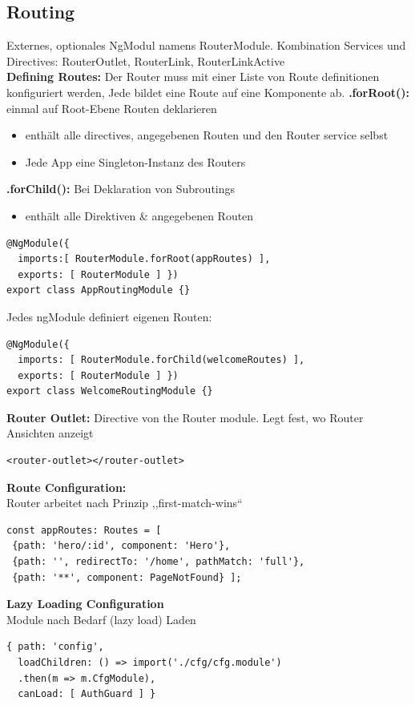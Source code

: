 \subsection{Routing}
Externes, optionales NgModul namens RouterModule. Kombination Services und Directives: RouterOutlet, RouterLink, RouterLinkActive\\
\textbf{Defining Routes:} Der Router muss mit einer Liste von Route definitionen konfiguriert werden, Jede bildet eine Route auf eine Komponente ab.
\textbf{.forRoot():} einmal auf Root-Ebene Routen deklarieren
\begin{itemize}
    \item enthält alle directives, angegebenen Routen und den Router service selbst
    \item Jede App eine Singleton-Instanz des Routers
\end{itemize}
\textbf{.forChild():} Bei Deklaration von Subroutings
\begin{itemize}
    \item enthält alle Direktiven \& angegebenen Routen
\end{itemize}
\begin{lstlisting}[style=JavaScript]
@NgModule({
  imports:[ RouterModule.forRoot(appRoutes) ],
  exports: [ RouterModule ] })
export class AppRoutingModule {}
\end{lstlisting}
Jedes ngModule definiert eigenen Routen:
\begin{lstlisting}[style=JavaScript]
@NgModule({
  imports: [ RouterModule.forChild(welcomeRoutes) ],
  exports: [ RouterModule ] })
export class WelcomeRoutingModule {}
\end{lstlisting}
\textbf{Router Outlet:} Directive von the Router module. Legt fest, wo Router Ansichten anzeigt
\begin{lstlisting}
<router-outlet></router-outlet>
\end{lstlisting}
\textbf{Route Configuration:}\\
Router arbeitet nach Prinzip ,,first-match-wins``
\begin{lstlisting}
const appRoutes: Routes = [
 {path: 'hero/:id', component: 'Hero'},
 {path: '', redirectTo: '/home', pathMatch: 'full'},
 {path: '**', component: PageNotFound} ];
\end{lstlisting}
\textbf{Lazy Loading Configuration}\\
Module nach Bedarf (lazy load) Laden
\begin{lstlisting}[style=JavaScript]
{ path: 'config',
  loadChildren: () => import('./cfg/cfg.module')
  .then(m => m.CfgModule),
  canLoad: [ AuthGuard ] }
\end{lstlisting}

